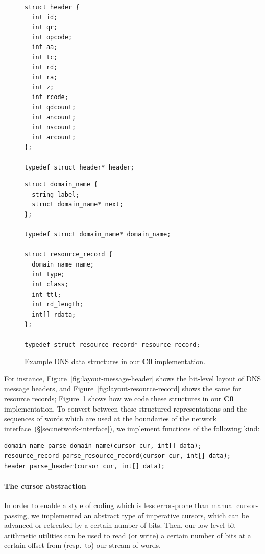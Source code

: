 \documentclass{article}
\newcommand\Kwd[1]{{\sffamily\bfseries{#1}}}
\begin{document}
\begin{figure}
  \begin{lstlisting}[frame=single]
struct header {
  int id;
  int qr;
  int opcode;
  int aa;
  int tc;
  int rd;
  int ra;
  int z;
  int rcode;
  int qdcount;
  int ancount;
  int nscount;
  int arcount;
};

typedef struct header* header;
  \end{lstlisting}

  \begin{lstlisting}[frame=single]
struct domain_name {
  string label;
  struct domain_name* next;
};

typedef struct domain_name* domain_name;

struct resource_record {
  domain_name name;
  int type;
  int class;
  int ttl;
  int rd_length;
  int[] rdata;
};

typedef struct resource_record* resource_record;
  \end{lstlisting}
  \caption{Example DNS data structures in our \Kwd{C0} implementation.}\label{fig:c0-data-structures}
\end{figure}

For instance, Figure~\ref{fig:layout-message-header} shows the
bit-level layout of DNS message headers, and
Figure~\ref{fig:layout-resource-record} shows the same for resource
records; Figure~\ref{fig:c0-data-structures} shows how we code these
structures in our \Kwd{C0} implementation. To convert between these
structured representations and the sequences of words which are used
at the boundaries of the network
interface~(\S\ref{sec:network-interface}), we implement functions of
the following kind:

\begin{lstlisting}
domain_name parse_domain_name(cursor cur, int[] data);
resource_record parse_resource_record(cursor cur, int[] data);
header parse_header(cursor cur, int[] data);
\end{lstlisting}

\paragraph{The cursor abstraction}
In order to enable a style of coding which is less error-prone than
manual cursor-passing, we implemented an abstract type of imperative
cursors, which can be advanced or retreated by a certain number of
bits. Then, our low-level bit arithmetic utilities can be used to read
(or write) a certain number of bits at a certain offset from (resp.\
to) our stream of words.
\end{document}
